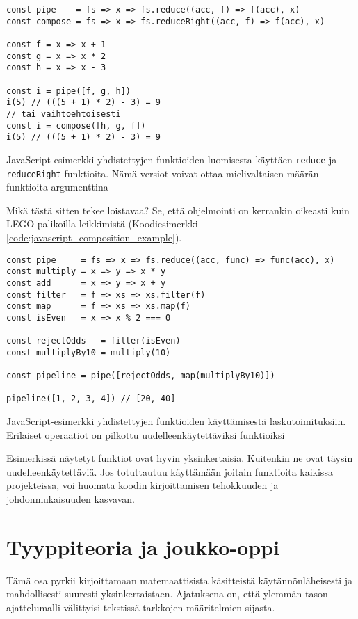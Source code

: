 \begin{code}
    \begin{verbatim}
const pipe    = fs => x => fs.reduce((acc, f) => f(acc), x)
const compose = fs => x => fs.reduceRight((acc, f) => f(acc), x)

const f = x => x + 1
const g = x => x * 2
const h = x => x - 3

const i = pipe([f, g, h])
i(5) // (((5 + 1) * 2) - 3) = 9
// tai vaihtoehtoisesti
const i = compose([h, g, f])
i(5) // (((5 + 1) * 2) - 3) = 9
\end{verbatim}
    \caption{JavaScript-esimerkki yhdistettyjen funktioiden luomisesta käyttäen \texttt{reduce} ja \texttt{reduceRight} funktioita. Nämä versiot voivat ottaa mielivaltaisen määrän funktioita argumenttina}
    \label{code:javascript_better_pipe}
\end{code}

Mikä tästä sitten tekee loistavaa? Se, että ohjelmointi on kerrankin oikeasti kuin LEGO palikoilla leikkimistä (Koodiesimerkki \ref{code:javascript_composition_example}).

\begin{code}
    \begin{verbatim}
const pipe     = fs => x => fs.reduce((acc, func) => func(acc), x)
const multiply = x => y => x * y
const add      = x => y => x + y
const filter   = f => xs => xs.filter(f)
const map      = f => xs => xs.map(f)
const isEven   = x => x % 2 === 0

const rejectOdds   = filter(isEven)
const multiplyBy10 = multiply(10)

const pipeline = pipe([rejectOdds, map(multiplyBy10)])

pipeline([1, 2, 3, 4]) // [20, 40]
\end{verbatim}
    \caption{JavaScript-esimerkki yhdistettyjen funktioiden käyttämisestä laskutoimituksiin. Erilaiset operaatiot on pilkottu uudelleenkäytettäviksi funktioiksi}
    \label{code:javascript_composition_example}
\end{code}

Esimerkissä näytetyt funktiot ovat hyvin yksinkertaisia. Kuitenkin ne ovat täysin uudelleenkäytettäviä. Jos totuttautuu käyttämään joitain funktioita kaikissa projekteissa, voi huomata koodin kirjoittamisen tehokkuuden ja johdonmukaisuuden kasvavan.

\section{Tyyppiteoria ja joukko-oppi}
Tämä osa pyrkii kirjoittamaan matemaattisista käsitteistä käytännönläheisesti ja mahdollisesti suuresti yksinkertaistaen. Ajatuksena on, että ylemmän tason ajattelumalli välittyisi tekstissä tarkkojen määritelmien sijasta.

